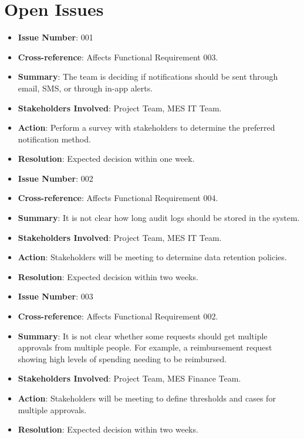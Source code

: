 \documentclass[12pt]{article}
\begin{document}
\section{Open Issues}
\begin{itemize}
  \item \textbf{Issue Number}: 001
  \item \textbf{Cross-reference}: Affects Functional Requirement 003.
  \item \textbf{Summary}: The team is deciding if notifications should be sent through email, SMS, or through in-app alerts.
  \item \textbf{Stakeholders Involved}: Project Team, MES IT Team.
  \item \textbf{Action}: Perform a survey with stakeholders to determine the preferred notification method.
  \item \textbf{Resolution}: Expected decision within one week.

  \bigskip

  \item \textbf{Issue Number}: 002
  \item \textbf{Cross-reference}: Affects Functional Requirement 004.
  \item \textbf{Summary}: It is not clear how long audit logs should be stored in the system.
  \item \textbf{Stakeholders Involved}: Project Team, MES IT Team.
  \item \textbf{Action}: Stakeholders will be meeting to determine data retention policies. 
  \item \textbf{Resolution}: Expected decision within two weeks.

  \bigskip

  \item \textbf{Issue Number}: 003
  \item \textbf{Cross-reference}: Affects Functional Requirement 002.
  \item \textbf{Summary}: It is not clear whether some requests should get multiple approvals from multiple people. For example, a reimbursement request showing high levels of spending needing to be reimbursed.
  \item \textbf{Stakeholders Involved}: Project Team, MES Finance Team.
  \item \textbf{Action}: Stakeholders will be meeting to define thresholds and cases for multiple approvals.
  \item \textbf{Resolution}: Expected decision within two weeks.

  \bigskip

\end{itemize}
\end{document}
